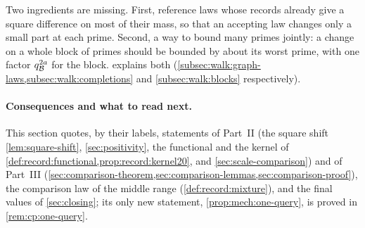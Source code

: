 Two ingredients are missing. First, reference laws whose records
already give a square difference on most of their mass, so that an
accepting law changes only a small part at each prime. Second, a way
to bound many primes jointly: a change on a whole block of primes
should be bounded by about its worst prime, with one factor
$q_{\mathcal B}^{2a}$ for the block.  explains both
(\cref{subsec:walk:graph-laws,subsec:walk:completions} and
\cref{subsec:walk:blocks} respectively).

\paragraph{Consequences and what to read next.}
This section quotes, by their labels, statements of Part~II (the square
shift \cref{lem:square-shift}, \cref{sec:positivity}, the functional and the
kernel of \cref{def:record:functional,prop:record:kernel20}, and
\cref{sec:scale-comparison}) and of Part~III
(\cref{sec:comparison-theorem,sec:comparison-lemmas,sec:comparison-proof}), the
comparison law of the middle range (\cref{def:record:mixture}), and
the final values of \cref{sec:closing}; its only new statement,
\cref{prop:mech:one-query}, is proved in \cref{rem:cp:one-query}.
